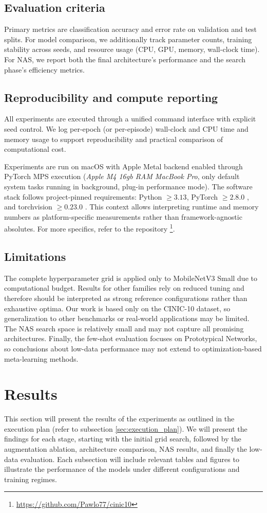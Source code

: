 \documentclass[cameraready]{Interspeech}
\begin{document}
\subsection{Evaluation criteria}
Primary metrics are classification accuracy and error rate on validation and test splits. For model comparison, we additionally track parameter counts, training stability across seeds, and resource usage (CPU, GPU, memory, wall-clock time). For NAS, we report both the final architecture's performance and the search phase's efficiency metrics.

\subsection{Reproducibility and compute reporting}
All experiments are executed through a unified command interface with explicit seed control. We log per-epoch (or per-episode) wall-clock and CPU time and memory usage to support reproducibility and practical comparison of computational cost.

Experiments are run on macOS with Apple Metal backend enabled through PyTorch MPS execution (\textit{Apple M4 16gb RAM MacBook Pro}, only default system tasks running in background, plug-in performance mode). The software stack follows project-pinned requirements: Python $\geq 3.13$, PyTorch $\geq 2.8.0$ \cite{NEURIPS2019_9015}, and torchvision $\geq 0.23.0$ \cite{torchvision}. This context allows interpreting runtime and memory numbers as platform-specific measurements rather than framework-agnostic absolutes. For more specifics, refer to the repository \footnote{\url{https://github.com/Pawlo77/cinic10}}.

\subsection{Limitations}
The complete hyperparameter grid is applied only to MobileNetV3 Small due to computational budget. Results for other families rely on reduced tuning and therefore should be interpreted as strong reference configurations rather than exhaustive optima. Our work is based only on the CINIC-10 dataset, so generalization to other benchmarks or real-world applications may be limited. The NAS search space is relatively small and may not capture all promising architectures. Finally, the few-shot evaluation focuses on Prototypical Networks, so conclusions about low-data performance may not extend to optimization-based meta-learning methods.

\section{Results}
This section will present the results of the experiments as outlined in the execution plan (refer to subsection \ref{sec:execution_plan}). We will present the findings for each stage, starting with the initial grid search, followed by the augmentation ablation, architecture comparison, NAS results, and finally the low-data evaluation. Each subsection will include relevant tables and figures to illustrate the performance of the models under different configurations and training regimes.
\end{document}
